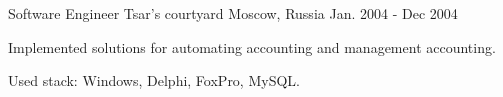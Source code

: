\begin{cventries}
  \cventry
    {Software Engineer}
    {Tsar's courtyard}
    {Moscow, Russia}
    {Jan. 2004 - Dec 2004}
    {
      \begin{cvitems}
        \item {Implemented solutions for automating accounting and management accounting.}
        \item {Used stack: Windows, Delphi, FoxPro, MySQL.}
      \end{cvitems}
    }

\end{cventries}
